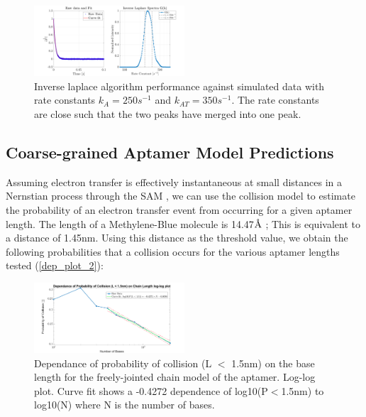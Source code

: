 \begin{figure}[H]
    \centering
    \includegraphics[width = 0.5\textwidth]{img/Inv_laplace_250_350.png}
    \caption{Inverse laplace algorithm performance against simulated data with rate constants $k_{A} = 250s^{-1}$ and $k_{AT} = 350s^{-1}$. The rate constants are close such that the two peaks have merged into one peak.}
    \label{multiexp_4}
\end{figure}
\subsection{Coarse-grained Aptamer Model Predictions}
Assuming electron transfer is effectively instantaneous at small distances in a Nernstian process through the SAM \cite{finklea1992electron,smalley1995kinetics}, we can use the collision model \cite{huang2013random} to estimate the probability of an electron transfer event from occurring for a given aptamer length. The length of a Methylene-Blue molecule is 14.47$\textup{\AA}$ \cite{dotto2015adsorption}; This is equivalent to a distance of 1.45nm. Using this distance as the threshold value, we obtain the following probabilities that a collision occurs for the various aptamer lengths tested (\autoref{dep_plot_2}):
\begin{figure}[H]
    \centering
    \includegraphics[width = 0.5\textwidth]{img/Length_dep_bases_log.png}
    \caption{Dependance of probability of collision (L $<$ 1.5nm) on the base length for the freely-jointed chain model of the aptamer. Log-log plot. Curve fit shows a -0.4272 dependence of log10(P$<$1.5nm) to log10(N) where N is the number of bases.}
    \label{dep_plot_2}
\end{figure}
